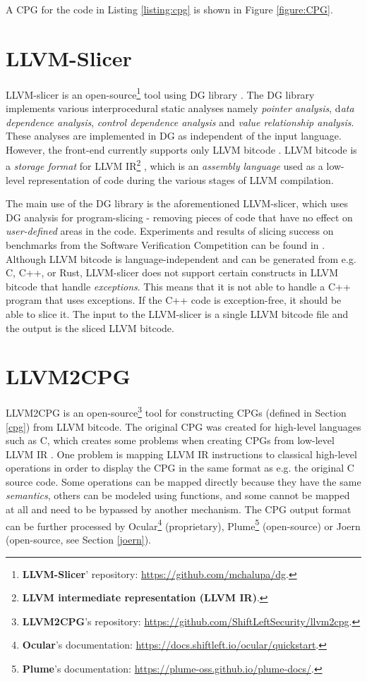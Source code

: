 A CPG for the code in Listing \ref{listing:cpg} is shown in Figure \ref{figure:CPG}.

\section{LLVM-Slicer}
\label{slicer}

LLVM-slicer is an open-source\footnote{\textbf{LLVM-Slicer}' repository: \url{https://github.com/mchalupa/dg}.} tool using DG library \cite{DG-2-chalupa2020dg, DG-chalupa2020dg}. The DG library implements various interprocedural static analyses namely \textit{pointer analysis}, d\textit{ata dependence analysis}, \textit{control dependence analysis} and \textit{value relationship analysis}. These analyses are implemented in DG as independent of the input language. However, the front-end currently supports only LLVM bitcode \cite{LLVM-bitcode}. LLVM bitcode is a \textit{storage format} for LLVM IR\footnote{\textbf{LLVM intermediate representation (LLVM IR)}.} \cite{LLVM-IR}, which is an \textit{assembly language} used as a low-level representation of code during the various stages of LLVM compilation.

The main use of the DG library is the aforementioned LLVM-slicer, which uses DG analysis for program-slicing - removing pieces of code that have no effect on \textit{user-defined} areas in the code. Experiments and results of slicing success on benchmarks from the Software Verification Competition can be found in \cite{DG-chalupa2020dg}. Although LLVM bitcode is language-independent and can be generated from e.g. C, C++, or Rust, LLVM-slicer does not support certain constructs in LLVM bitcode that handle \textit{exceptions}. This means that it is not able to handle a C++ program that uses exceptions. If the C++ code is exception-free, it should be able to slice it. The input to the LLVM-slicer is a single LLVM bitcode file and the output is the sliced LLVM bitcode.

\section{LLVM2CPG}
\label{llvm2cpg}

LLVM2CPG is an open-source\footnote{\textbf{LLVM2CPG}'s repository: \url{https://github.com/ShiftLeftSecurity/llvm2cpg}.} tool for constructing CPGs (defined in Section \ref{cpg}) from LLVM bitcode. The original CPG was created for high-level languages such as C, which creates some problems when creating CPGs from low-level LLVM IR \cite{llvm2cpg-webpage}. One problem is mapping LLVM IR instructions to classical high-level operations in order to display the CPG in the same format as e.g. the original C source code. Some operations can be mapped directly because they have the same \textit{semantics}, others can be modeled using functions, and some cannot be mapped at all and need to be bypassed by another mechanism. The CPG output format can be further processed by Ocular\footnote{\textbf{Ocular}'s documentation: \url{https://docs.shiftleft.io/ocular/quickstart}.} (proprietary), Plume\footnote{\textbf{Plume}'s documentation: \url{https://plume-oss.github.io/plume-docs/}.} (open-source) or Joern (open-source, see Section \ref{joern}).


